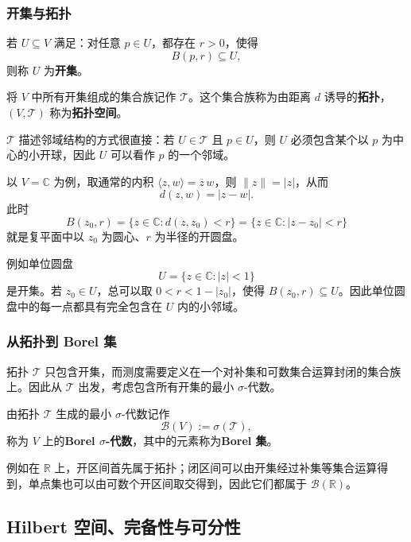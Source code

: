 \documentclass[UTF8,a4paper,11pt,openany]{ctexbook}
\begin{document}
\subsubsection{开集与拓扑}

\begin{definition}[开集与拓扑]
若 $U\subseteq V$ 满足：对任意 $p\in U$，都存在 $r>0$，使得
\[
B(p,r)\subseteq U,
\]
则称 $U$ 为\textbf{开集}。

将 $V$ 中所有开集组成的集合族记作 $\mathcal T$。这个集合族称为由距离 $d$ 诱导的\textbf{拓扑}，$(V,\mathcal T)$ 称为\textbf{拓扑空间}。
\end{definition}

$\mathcal T$ 描述邻域结构的方式很直接：若 $U\in\mathcal T$ 且 $p\in U$，则 $U$ 必须包含某个以 $p$ 为中心的小开球，因此 $U$ 可以看作 $p$ 的一个邻域。

以 $V=\mathbb C$ 为例，取通常的内积 $\langle z,w\rangle=\overline z\,w$，则 $\|z\|=|z|$，从而
\[
d(z,w)=|z-w|.
\]
此时
\[
B(z_0,r)
=
\{z\in\mathbb C:d(z,z_0)<r\}
=
\{z\in\mathbb C:|z-z_0|<r\}
\]
就是复平面中以 $z_0$ 为圆心、$r$ 为半径的开圆盘。

例如单位圆盘
\[
U=\{z\in\mathbb C:|z|<1\}
\]
是开集。若 $z_0\in U$，总可以取 $0<r<1-|z_0|$，使得 $B(z_0,r)\subseteq U$。因此单位圆盘中的每一点都具有完全包含在 $U$ 内的小邻域。

\subsubsection{从拓扑到 Borel 集}

拓扑 $\mathcal T$ 只包含开集，而测度需要定义在一个对补集和可数集合运算封闭的集合族上。因此从 $\mathcal T$ 出发，考虑包含所有开集的最小 $\sigma$-代数。

\begin{definition}
由拓扑 $\mathcal T$ 生成的最小 $\sigma$-代数记作
\begin{equation}
    \mathcal B(V)
    :=
    \sigma(\mathcal T),
\end{equation}
称为 $V$ 上的\textbf{Borel $\sigma$-代数}，其中的元素称为\textbf{Borel 集}。
\end{definition}

例如在 $\mathbb R$ 上，开区间首先属于拓扑；闭区间可以由开集经过补集等集合运算得到，单点集也可以由可数个开区间取交得到，因此它们都属于 $\mathcal B(\mathbb R)$。

\subsection{Hilbert 空间、完备性与可分性}
\end{document}
